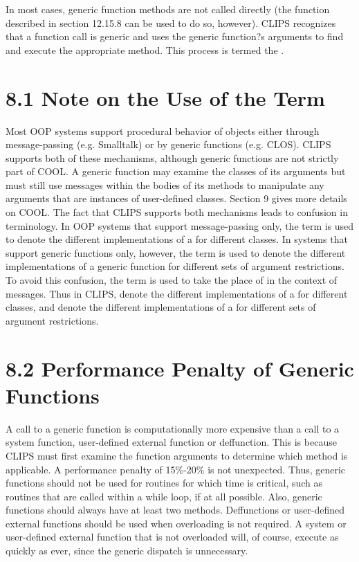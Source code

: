 \documentclass[letterpaper,10pt,english]{sphinxmanual}
\begin{document}
In most cases, generic function methods are not called directly (the
function  described in section 12.15.8 can be
used to do so, however). CLIPS recognizes that a function call is
generic and uses the generic function?s arguments to find and execute
the appropriate method. This process is termed the .


\section{8.1 Note on the Use of the Term }
\label{\detokenize{generic:note-on-the-use-of-the-term-method}}
Most OOP systems support procedural behavior of objects either through
message-passing (e.g. Smalltalk) or by generic functions (e.g. CLOS).
CLIPS supports both of these mechanisms, although generic functions are
not strictly part of COOL. A generic function may examine the classes of
its arguments but must still use messages within the bodies of its
methods to manipulate any arguments that are instances of user-defined
classes. Section 9 gives more details on COOL. The fact that CLIPS
supports both mechanisms leads to confusion in terminology. In OOP
systems that support message-passing only, the term  is used
to denote the different implementations of a  for different
classes. In systems that support generic functions only, however, the
term  is used to denote the different implementations of a
generic function for different sets of argument restrictions. To avoid
this confusion, the term  is used to take the place
of  in the context of messages. Thus in CLIPS,
 denote the different implementations of a
 for different classes, and  denote the different
implementations of a  for different sets of argument
restrictions.


\section{8.2 Performance Penalty of Generic Functions}
\label{\detokenize{generic:performance-penalty-of-generic-functions}}
A call to a generic function is computationally more expensive than a
call to a system function, user-defined external function or
deffunction. This is because CLIPS must first examine the function
arguments to determine which method is applicable. A performance penalty
of 15\%-20\% is not unexpected. Thus, generic functions should not be used
for routines for which time is critical, such as routines that are
called within a while loop, if at all possible. Also, generic functions
should always have at least two methods. Deffunctions or user-defined
external functions should be used when overloading is not required. A
system or user-defined external function that is not overloaded will, of
course, execute as quickly as ever, since the generic dispatch is
unnecessary.
\end{document}
